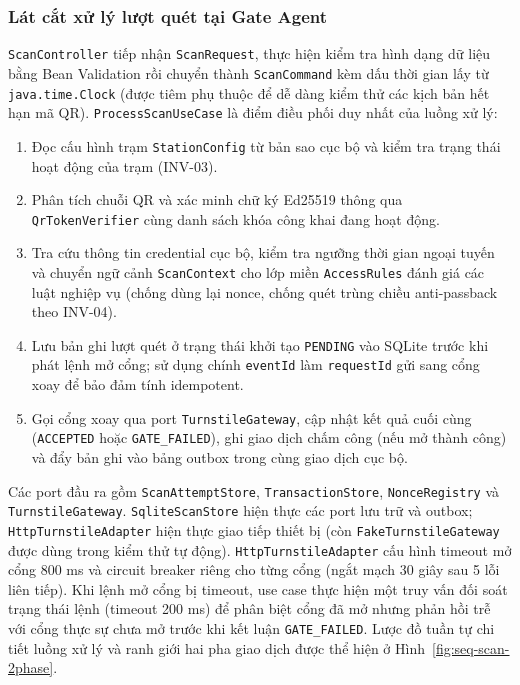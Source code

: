 \subsubsection{Lát cắt xử lý lượt quét tại Gate Agent}

\texttt{ScanController} tiếp nhận \texttt{ScanRequest}, thực hiện kiểm tra hình dạng dữ liệu bằng
Bean Validation rồi chuyển thành \texttt{ScanCommand} kèm dấu thời gian lấy từ \texttt{java.time.Clock}
(được tiêm phụ thuộc để dễ dàng kiểm thử các kịch bản hết hạn mã QR). \texttt{ProcessScanUseCase} là
điểm điều phối duy nhất của luồng xử lý:
\begin{enumerate}
    \item Đọc cấu hình trạm \texttt{StationConfig} từ bản sao cục bộ và kiểm tra trạng thái hoạt động
    của trạm (INV-03).
    \item Phân tích chuỗi QR và xác minh chữ ký Ed25519 thông qua \texttt{QrTokenVerifier} cùng danh
    sách khóa công khai đang hoạt động.
    \item Tra cứu thông tin credential cục bộ, kiểm tra ngưỡng thời gian ngoại tuyến và chuyển ngữ
    cảnh \texttt{ScanContext} cho lớp miền \texttt{AccessRules} đánh giá các luật nghiệp vụ (chống
    dùng lại nonce, chống quét trùng chiều anti-passback theo INV-04).
    \item Lưu bản ghi lượt quét ở trạng thái khởi tạo \texttt{PENDING} vào SQLite trước khi phát lệnh
    mở cổng; sử dụng chính \texttt{eventId} làm \texttt{requestId} gửi sang cổng xoay để bảo đảm tính
    idempotent.
    \item Gọi cổng xoay qua port \texttt{TurnstileGateway}, cập nhật kết quả cuối cùng
    (\texttt{ACCEPTED} hoặc \texttt{GATE\_FAILED}), ghi giao dịch chấm công (nếu mở thành công) và
    đẩy bản ghi vào bảng outbox trong cùng giao dịch cục bộ.
\end{enumerate}

Các port đầu ra gồm \texttt{ScanAttemptStore}, \texttt{TransactionStore}, \texttt{NonceRegistry} và
\texttt{TurnstileGateway}. \texttt{SqliteScanStore} hiện thực các port lưu trữ và outbox;
\texttt{HttpTurnstileAdapter} hiện thực giao tiếp thiết bị (còn \texttt{FakeTurnstileGateway} được
dùng trong kiểm thử tự động). \texttt{HttpTurnstileAdapter} cấu hình timeout mở cổng 800 ms và
circuit breaker riêng cho từng cổng (ngắt mạch 30 giây sau 5 lỗi liên tiếp). Khi lệnh mở cổng bị
timeout, use case thực hiện một truy vấn đối soát trạng thái lệnh (timeout 200 ms) để phân biệt cổng
đã mở nhưng phản hồi trễ với cổng thực sự chưa mở trước khi kết luận \texttt{GATE\_FAILED}.
Lược đồ tuần tự chi tiết luồng xử lý và ranh giới hai pha giao dịch được thể hiện ở
Hình~\ref{fig:seq-scan-2phase}.

